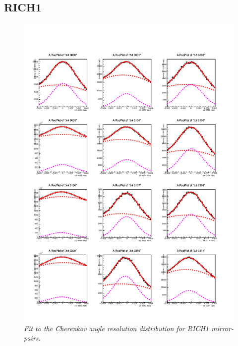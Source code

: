 \subsection{RICH1}
\begin{figure}[!h]
	\vspace*{-0.cm}
	\begin{center}
		\includegraphics[width=1.\textwidth]{rich1_p1.pdf}
		\vspace*{-1.5cm}
	\end{center}
	\caption{\textit{Fit to the Cherenkov angle resolution distribution for RICH1 mirror-pairs.}}
	\label{fig:rich1p1}
\end{figure}
\clearpage
